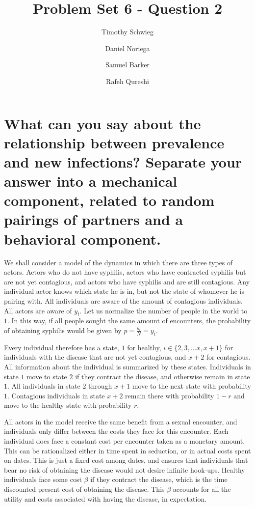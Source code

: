\documentclass[12pt]{paper}
\title{Problem Set 6 - Question 2}
\author{ Timothy Schwieg \and Daniel Noriega \and Samuel Barker \and
  Rafeh Qureshi}
\begin{document}
\maketitle

\section*{What can you say about the relationship between prevalence
  and new infections? Separate your answer into a mechanical
  component, related to random pairings of partners and a behavioral
  component.}

We shall consider a model of the dynamics in which there are three
types of actors.  Actors who do not have syphilis, actors who have
contracted syphilis but are not yet contagious, and actors who have
syphilis and are still contagious. Any individual actor knows which
state he is in, but not the state of whomever he is pairing
with. All individuals are aware of the amount of contagious
individuals. All actors are aware of $y_t$. Let us normalize the
number of people in the world to $1$. In this way, if all people
sought the same amount of encounters, the probability of obtaining
syphilis would be given by $p = \frac{y_t}{N} = y_t$.

Every individual therefore has a state, $1$ for healthy,
$i \in \{ 2,3,... x, x+1 \}$ for individuals with the disease that are
not yet contagious, and $x+2$ for contagious. All information about
the individual is summarized by these states. Individuals in state $1$
move to state $2$ if they contract the disease, and otherwise remain
in state $1$. All individuals in state $2$ through $x+1$ move to the
next state with probability $1$. Contagious individuals in state $x+2$
remain there with probability $1-r$ and move to the healthy state with
probability $r$.

All actors in the model receive the same benefit from a sexual
encounter, and individuals only differ between the costs they face for
this encounter. Each individual does face a constant cost per
encounter taken as a monetary amount. This can be rationalized either
in time spent in seduction, or in actual costs spent on dates. This is
just a fixed cost among dates, and ensures that individuals that bear
no risk of obtaining the disease would not desire infinite
hook-ups. Healthy individuals face some cost $\beta$ if they contract the
disease, which is the time discounted present cost of obtaining the
disease. This $\beta$ accounts for all the utility and costs associated
with having the disease, in expectation. 
 
\end{document}
